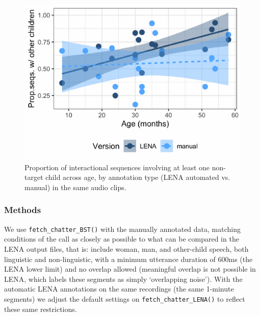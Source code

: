 \documentclass[10pt, letterpaper]{article}
\newenvironment{CodeChunk}{}{}
\begin{document}
\begin{CodeChunk}
\begin{figure}[h!]

{\centering \includegraphics{figs/tsi.is.fig-1} 

}

\caption[Proportion of interactional sequences involving at least one non-target child across age, by annotation type (LENA automated vs]{Proportion of interactional sequences involving at least one non-target child across age, by annotation type (LENA automated vs. manual) in the same audio clips.}\label{fig:tsi.is.fig}
\end{figure}
\end{CodeChunk}

\hypertarget{methods-1}{%
\subsubsection{Methods}\label{methods-1}}

We use \texttt{fetch\_chatter\_BST()} with the manually annotated data,
matching conditions of the call as closely as possible to what can be
compared in the LENA output files, that is: include woman, man, and
other-child speech, both linguistic and non-linguistic, with a minimum
utterance duration of 600ms (the LENA lower limit) and no overlap
allowed (meaningful overlap is not possible in LENA, which labels these
segments as simply `overlapping noise'). With the automatic LENA
annotations on the same recordings (the same 1-minute segments) we
adjust the default settings on \texttt{fetch\_chatter\_LENA()} to
reflect these same restrictions.
\end{document}
